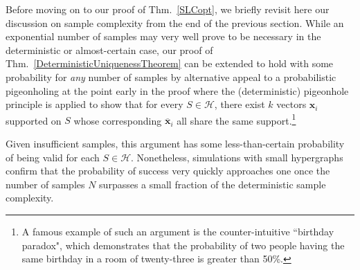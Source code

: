 \documentclass[journal, twocolumn]{IEEEtran}
\begin{document}
Before moving on to our proof of Thm.~\ref{SLCopt}, we briefly revisit here our discussion on sample complexity from the end of the previous section. While an exponential number of samples may very well prove to be necessary in the deterministic or almost-certain case, our proof of Thm.~\ref{DeterministicUniquenessTheorem} can be extended to hold with some probability for \emph{any} number of samples by alternative appeal to a probabilistic pigeonholing at the point early in the proof where the (deterministic) pigeonhole principle is applied to show that for every $S \in \mathcal{H}$, there exist $k$ vectors $\mathbf{x}_i$ supported on $S$ whose corresponding $\mathbf{\overline x}_i$ all share the same support.\footnote{A famous example of such an argument is the counter-intuitive ``birthday paradox", which demonstrates that the probability of two people having the same birthday in a room of twenty-three is greater than 50\%.} 

Given insufficient samples, this argument has some less-than-certain probability of being valid for each $S \in \mathcal{H}$. Nonetheless, simulations with small hypergraphs confirm that the probability of success very quickly approaches one once the number of samples $N$ surpasses a small fraction of the deterministic sample complexity. 
\end{document}
